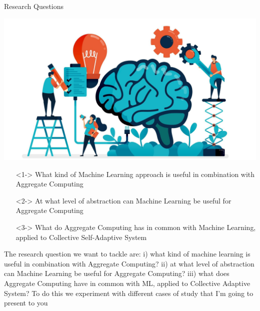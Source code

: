 
\begin{frame}{Research Questions}
  \begin{backgroundblock} 
    \includegraphics[width=\paperwidth]{img/background.jpg} 
  \end{backgroundblock} 
  \begin{card}
    \begin{itemize}
      \item[\faQuestion] <1-> What kind of Machine Learning approach is useful in combination with Aggregate Computing
      \item[\faQuestion] <2-> At what level of abstraction can Machine Learning be useful for Aggregate Computing
      \item[\faQuestion] <3-> What do Aggregate Computing has in common with Machine Learning, applied to Collective Self-Adaptive System
    \end{itemize}  
  \end{card}
  \pdfcomment 
  {
    The research question we want to tackle are: 
    i) what kind of machine learning is useful in combination with Aggregate Computing? 
    ii) at what level of abstraction can Machine Learning be useful for Aggregate Computing? 
    iii) what does Aggregate Computing have in common with ML, applied to Collective Adaptive System? 
    To do this we experiment with different cases of study that I'm going to present to you  
  }
\end{frame}